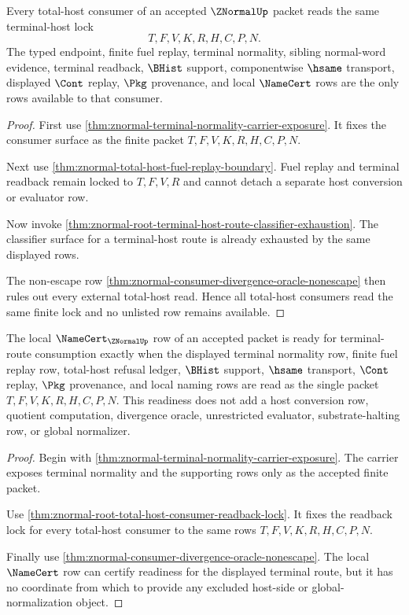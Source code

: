 \begin{theorem}
\label{thm:znormal-root-total-host-consumer-readback-lock}
Every total-host consumer of an accepted $\ZNormalUp$ packet reads the same
terminal-host lock
$$
T,F,V,K,R,H,C,P,N.
$$
The typed endpoint, finite fuel replay, terminal normality, sibling
normal-word evidence, terminal readback, $\BHist$ support, componentwise
$\hsame$ transport, displayed $\Cont$ replay, $\Pkg$ provenance, and local
$\NameCert$ rows are the only rows available to that consumer.
\end{theorem}
\begin{proof}
First use \autoref{thm:znormal-terminal-normality-carrier-exposure}. It fixes
the consumer surface as the finite packet $T,F,V,K,R,H,C,P,N$.

Next use \autoref{thm:znormal-total-host-fuel-replay-boundary}. Fuel replay
and terminal readback remain locked to $T,F,V,R$ and cannot detach a separate
host conversion or evaluator row.

Now invoke \autoref{thm:znormal-root-terminal-host-route-classifier-exhaustion}.
The classifier surface for a terminal-host route is already exhausted by the
same displayed rows.

The non-escape row \autoref{thm:znormal-consumer-divergence-oracle-nonescape}
then rules out every external total-host read. Hence all total-host consumers
read the same finite lock and no unlisted row remains available.
\end{proof}

\begin{theorem}
\label{thm:znormal-root-namecert-terminal-route-readiness}
The local $\NameCert_{\ZNormalUp}$ row of an accepted packet is ready for
terminal-route consumption exactly when the displayed terminal normality row,
finite fuel replay row, total-host refusal ledger, $\BHist$ support,
$\hsame$ transport, $\Cont$ replay, $\Pkg$ provenance, and local naming rows
are read as the single packet $T,F,V,K,R,H,C,P,N$. This readiness does not
add a host conversion row, quotient computation, divergence oracle,
unrestricted evaluator, substrate-halting row, or global normalizer.
\end{theorem}
\begin{proof}
Begin with \autoref{thm:znormal-terminal-normality-carrier-exposure}. The
carrier exposes terminal normality and the supporting rows only as the
accepted finite packet.

Use \autoref{thm:znormal-root-total-host-consumer-readback-lock}. It fixes the
readback lock for every total-host consumer to the same rows
$T,F,V,K,R,H,C,P,N$.

Finally use \autoref{thm:znormal-consumer-divergence-oracle-nonescape}. The
local $\NameCert$ row can certify readiness for the displayed terminal route,
but it has no coordinate from which to provide any excluded host-side or
global-normalization object.
\end{proof}
